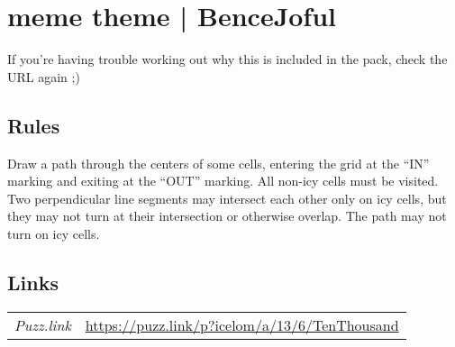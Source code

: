 \section[meme theme | BenceJoful {[\emph{Icelom}]}]{meme theme | {\normalfont BenceJoful}}
\label{sec:49-meme-theme-bencejoful}
If you're having trouble working out why this is included in the pack, check the URL again ;)
\subsection*{Rules}
\begin{markdown}
Draw a path through the centers of some cells, entering the grid at the “IN” marking and exiting at the “OUT” marking. All non-icy cells must be visited. Two perpendicular line segments may intersect each other only on icy cells, but they may not turn at their intersection or otherwise overlap. The path may not turn on icy cells.
\end{markdown}
\subsection*{Links}
\begin{tabularx}{\textwidth}{l X}
\emph{Puzz.link} & \url{https://puzz.link/p?icelom/a/13/6/TenThousand} \\
\end{tabularx}
\pagebreak
